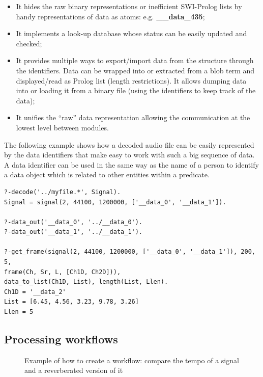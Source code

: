 \documentclass[runningheads]{llncs}
\begin{document}
\begin{itemize}
 \item It hides the raw binary representations or inefficient SWI-Prolog lists by handy representations of data as atoms: e.g. \textbf{\_\_data\_435};
 \item It implements a look-up database whose status can be easily updated and checked;
 \item It provides multiple ways to export/import data from the structure through the identifiers. Data can be wrapped into or extracted from a blob term and displayed/read as Prolog list (length restrictions). It allows dumping data into or loading it from a binary file (using the identifiers to keep track of the data);
 \item It unifies the ``raw'' data representation allowing the communication at the lowest level between modules.
\end{itemize}

The following example shows how a decoded audio file can be easily represented by the data identifiers that make easy to work with such a big sequence of data. A data identifier can be used in the same way as the name of a person to identify a data object which is related to other entities within a predicate.
\begin{verbatim}
?-decode('../myfile.*', Signal).
Signal = signal(2, 44100, 1200000, ['__data_0', '__data_1']).

?-data_out('__data_0', '../__data_0').
?-data_out('__data_1', '../__data_1').

?-get_frame(signal(2, 44100, 1200000, ['__data_0', '__data_1']), 200, 5,
frame(Ch, Sr, L, [Ch1D, Ch2D])),
data_to_list(Ch1D, List), length(List, Llen).
Ch1D = '__data_2'
List = [6.45, 4.56, 3.23, 9.78, 3.26]
Llen = 5
\end{verbatim}

\subsection{Processing workflows}\label{subsec:worflow}

\begin{figure}
\centerline{}
\caption{Example of how to create a workflow: compare the tempo of a signal and a reverberated version of it}
\label{fig:workflow}
\end{figure}
\end{document}
